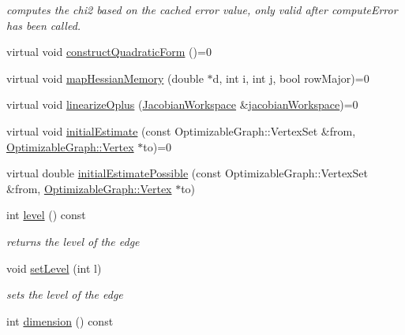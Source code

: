 \begin{DoxyCompactItemize}
\begin{DoxyCompactList}\small\item\em computes the chi2 based on the cached error value, only valid after compute\-Error has been called. \end{DoxyCompactList}\item 
virtual void \hyperlink{classg2o_1_1OptimizableGraph_1_1Edge_a56fbf3430ddf591e3c619bdd1b7e4499}{construct\-Quadratic\-Form} ()=0
\item 
virtual void \hyperlink{classg2o_1_1OptimizableGraph_1_1Edge_a3bd233fd552daa166039acf47b69a5a7}{map\-Hessian\-Memory} (double $\ast$d, int i, int j, bool row\-Major)=0
\item 
virtual void \hyperlink{classg2o_1_1OptimizableGraph_1_1Edge_a0fdad5ebfb4efec9f893b57f67e0fbe1}{linearize\-Oplus} (\hyperlink{classg2o_1_1JacobianWorkspace}{Jacobian\-Workspace} \&\hyperlink{structg2o_1_1OptimizableGraph_aa669dbd1d6e34e49fecda711ff1b78c6}{jacobian\-Workspace})=0
\item 
virtual void \hyperlink{classg2o_1_1OptimizableGraph_1_1Edge_a9519f8892e97f03daacb44ea50ac7f4e}{initial\-Estimate} (const Optimizable\-Graph\-::\-Vertex\-Set \&from, \hyperlink{classg2o_1_1OptimizableGraph_1_1Vertex}{Optimizable\-Graph\-::\-Vertex} $\ast$to)=0
\item 
virtual double \hyperlink{classg2o_1_1OptimizableGraph_1_1Edge_a1cef6ffa0f82f1ad3dd3d7a9f04425ee}{initial\-Estimate\-Possible} (const Optimizable\-Graph\-::\-Vertex\-Set \&from, \hyperlink{classg2o_1_1OptimizableGraph_1_1Vertex}{Optimizable\-Graph\-::\-Vertex} $\ast$to)
\item 
\hypertarget{classg2o_1_1OptimizableGraph_1_1Edge_af92bd1589a99fa9732a5f2964cf38a6c}{int \hyperlink{classg2o_1_1OptimizableGraph_1_1Edge_af92bd1589a99fa9732a5f2964cf38a6c}{level} () const }\label{classg2o_1_1OptimizableGraph_1_1Edge_af92bd1589a99fa9732a5f2964cf38a6c}

\begin{DoxyCompactList}\small\item\em returns the level of the edge \end{DoxyCompactList}\item 
\hypertarget{classg2o_1_1OptimizableGraph_1_1Edge_ab3e4290bc51d03ba294f36254048b15a}{void \hyperlink{classg2o_1_1OptimizableGraph_1_1Edge_ab3e4290bc51d03ba294f36254048b15a}{set\-Level} (int l)}\label{classg2o_1_1OptimizableGraph_1_1Edge_ab3e4290bc51d03ba294f36254048b15a}

\begin{DoxyCompactList}\small\item\em sets the level of the edge \end{DoxyCompactList}\item 
\hypertarget{classg2o_1_1OptimizableGraph_1_1Edge_a90a86891adc47a179a7cd7ef31549916}{int \hyperlink{classg2o_1_1OptimizableGraph_1_1Edge_a90a86891adc47a179a7cd7ef31549916}{dimension} () const }\label{classg2o_1_1OptimizableGraph_1_1Edge_a90a86891adc47a179a7cd7ef31549916}


\end{DoxyCompactItemize}
